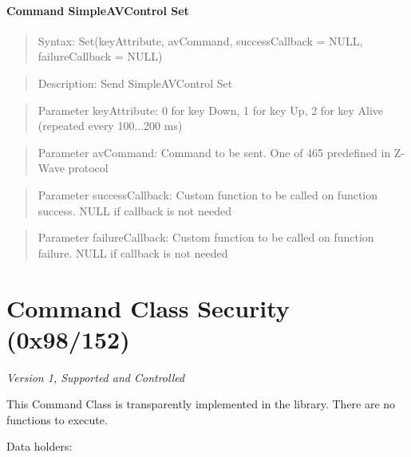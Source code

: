 \paragraph{Command SimpleAVControl Set}
\begin{quote}Syntax: Set(keyAttribute, avCommand, successCallback = NULL, failureCallback = NULL)\end{quote}
\begin{quote}Description: Send SimpleAVControl Set\end{quote}
\begin{quote}Parameter keyAttribute: 0 for key Down, 1 for key Up, 2 for key Alive (repeated every 100...200 ms)\end{quote}
\begin{quote}Parameter avCommand: Command to be sent. One of 465 predefined in Z-Wave protocol\end{quote}
\begin{quote}Parameter successCallback: Custom function to be called on function success. NULL if callback is not needed\end{quote}
\begin{quote}Parameter failureCallback: Custom function to be called on function failure. NULL if callback is not needed\end{quote}



\section{Command Class Security (0x98/152)}

\textit{Version 1, Supported and Controlled}
\newline

This Command Class is transparently implemented in the library. There are no functions to execute.
\newline

\noindent
Data holders:

